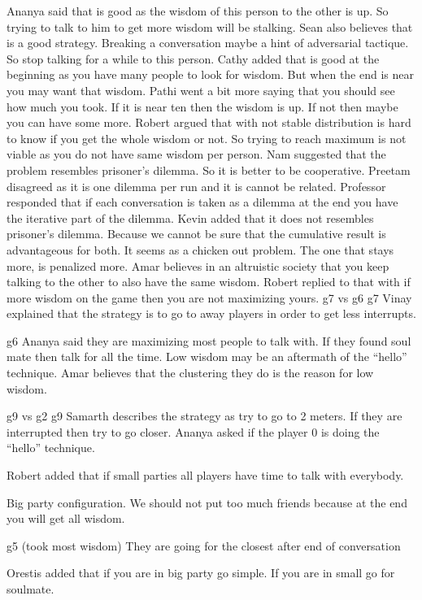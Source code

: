 Ananya said that is good as the wisdom of this person to the other is up. So trying to talk to him to get more wisdom will be stalking.
Sean also believes that is a good strategy. Breaking a conversation maybe a hint 
of adversarial tactique. So stop talking for a while to this person.
Cathy added that is good at the beginning as you have many people to look for wisdom. But when the end is near you may want that wisdom.
Pathi went a bit more saying that you should see how much you took. If it is near 
ten then the wisdom is up. If not then maybe you can have some more.
Robert argued that with not stable distribution is hard to know if you get the whole wisdom or not. So trying to reach maximum is not viable as you do not have same wisdom per person.
Nam suggested that the problem resembles prisoner’s dilemma. So it is better to be cooperative.
Preetam disagreed as it is one dilemma per run and it is cannot be related.
Professor responded that if each conversation is taken as a dilemma at the end you have the iterative part of the dilemma.
Kevin added that it does not resembles prisoner's dilemma. Because we cannot be sure that the cumulative result is advantageous for both. It seems as a chicken out problem. The one that stays more, is penalized more.
Amar believes in an altruistic society that you keep talking to the other to also have the same wisdom.
Robert replied to that with if more wisdom on the game then you are not maximizing yours.
g7 vs g6
g7 
Vinay explained that the strategy is to go to away players in order to get less interrupts.

g6
Ananya said they are maximizing most people to talk with. If they found soul mate then talk for all the time. Low wisdom may be an aftermath of the “hello” technique. 
Amar believes that the clustering they do is the reason for low wisdom.

g9 vs g2
g9 
Samarth describes the strategy as try to go to 2 meters. If they are interrupted then try to go closer.
Ananya asked if the player 0 is doing the “hello” technique. 

Robert added that if small parties all players have time to talk with everybody.

Big party configuration.
We should not put too much friends because at the end you will get all wisdom.

g5 (took most wisdom)
They are going for the closest after end of conversation

Orestis added that if you are in big party go simple. If you are in small go for soulmate.

